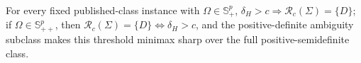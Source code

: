 For every fixed published-class instance with \(\Omega\in\mathbb S_+^p\), \(\delta_H>c\Longrightarrow\mathcal R_c(\Sigma)=\{D\}\); if \(\Omega\in\mathbb S_{++}^p\), then \(\mathcal R_c(\Sigma)=\{D\}\Longleftrightarrow\delta_H>c\), and the positive-definite ambiguity subclass makes this threshold minimax sharp over the full positive-semidefinite class.